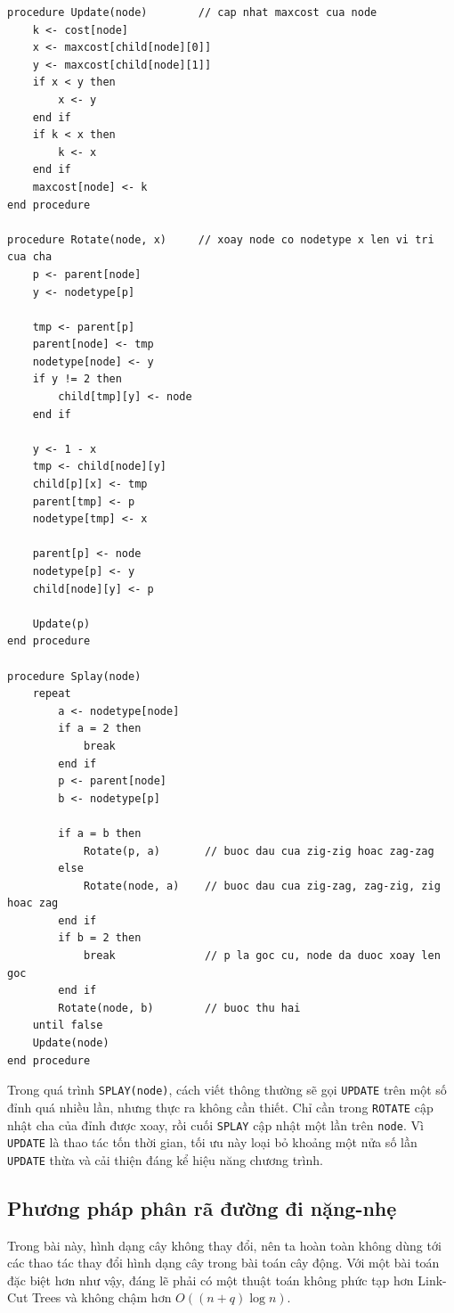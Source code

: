 \documentclass[11pt]{article}
\begin{document}
\begingroup
\small
\begin{verbatim}
procedure Update(node)        // cap nhat maxcost cua node
    k <- cost[node]
    x <- maxcost[child[node][0]]
    y <- maxcost[child[node][1]]
    if x < y then
        x <- y
    end if
    if k < x then
        k <- x
    end if
    maxcost[node] <- k
end procedure

procedure Rotate(node, x)     // xoay node co nodetype x len vi tri cua cha
    p <- parent[node]
    y <- nodetype[p]

    tmp <- parent[p]
    parent[node] <- tmp
    nodetype[node] <- y
    if y != 2 then
        child[tmp][y] <- node
    end if

    y <- 1 - x
    tmp <- child[node][y]
    child[p][x] <- tmp
    parent[tmp] <- p
    nodetype[tmp] <- x

    parent[p] <- node
    nodetype[p] <- y
    child[node][y] <- p

    Update(p)
end procedure

procedure Splay(node)
    repeat
        a <- nodetype[node]
        if a = 2 then
            break
        end if
        p <- parent[node]
        b <- nodetype[p]

        if a = b then
            Rotate(p, a)       // buoc dau cua zig-zig hoac zag-zag
        else
            Rotate(node, a)    // buoc dau cua zig-zag, zag-zig, zig hoac zag
        end if
        if b = 2 then
            break              // p la goc cu, node da duoc xoay len goc
        end if
        Rotate(node, b)        // buoc thu hai
    until false
    Update(node)
end procedure
\end{verbatim}
\endgroup

Trong quá trình \texttt{SPLAY(node)}, cách viết thông thường sẽ gọi
\texttt{UPDATE} trên một số đỉnh quá nhiều lần, nhưng thực ra không cần thiết.
Chỉ cần trong \texttt{ROTATE} cập nhật cha của đỉnh được xoay, rồi cuối
\texttt{SPLAY} cập nhật một lần trên \texttt{node}. Vì \texttt{UPDATE} là thao
tác tốn thời gian, tối ưu này loại bỏ khoảng một nửa số lần \texttt{UPDATE}
thừa và cải thiện đáng kể hiệu năng chương trình.

\subsection{Phương pháp phân rã đường đi nặng-nhẹ}

Trong bài này, hình dạng cây không thay đổi, nên ta hoàn toàn không dùng tới
các thao tác thay đổi hình dạng cây trong bài toán cây động. Với một bài toán
đặc biệt hơn như vậy, đáng lẽ phải có một thuật toán không phức tạp hơn
Link-Cut Trees và không chậm hơn $O((n+q)\log n)$.
\end{document}
